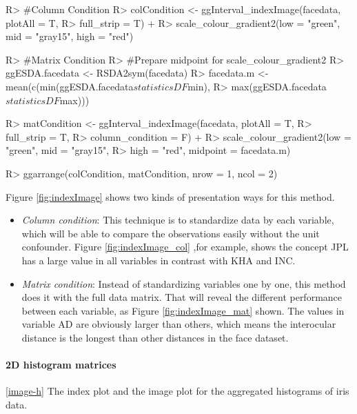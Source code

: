 \documentclass[article]{jss}
\begin{document}
\begin{CodeChunk}
\begin{CodeInput}
R> #Column Condition
R> colCondition <- ggInterval_indexImage(facedata, plotAll = T,
                                      R> full_strip = T) +
R>   scale_colour_gradient2(low = "green", mid = "gray15", high = "red")

R> #Matrix Condition
R> #Prepare midpoint for scale_colour_gradient2
R> ggESDA.facedata <- RSDA2sym(facedata)
R> facedata.m <- mean(c(min(ggESDA.facedata$statisticsDF$min),
R>                      max(ggESDA.facedata$statisticsDF$max)))
                                      
R> matCondition <- ggInterval_indexImage(facedata, plotAll = T,
R>                                       full_strip = T,
R>                                       column_condition = F) + 
R>   scale_colour_gradient2(low = "green", mid = "gray15", 
R>                          high = "red", midpoint = facedata.m)

R> ggarrange(colCondition, matCondition, nrow = 1, ncol = 2)
\end{CodeInput}
\end{CodeChunk}



Figure \ref{fig:indexImage} shows two kinds of presentation ways for this method.

\begin{itemize}
  \item \emph{Column condition}: This technique is to standardize data by each variable, which will be able to compare the observations easily without the unit confounder. Figure \ref{fig:indexImage_col} ,for example, shows the concept JPL has a large value in all variables in contrast with KHA and INC.
  \item \emph{Matrix condition}: Instead of standardizing variables one by one, this method does it with the full data matrix. That will reveal the different performance between each variable, as Figure \ref{fig:indexImage_mat} shown. The values in variable AD are obviously larger than others, which means the interocular distance is the longest than other distances in the face dataset.
\end{itemize}



\paragraph{2D histogram matrices}
\ref{image-h} The index plot and the image plot for the aggregated histograms 
of 
iris data.
\end{document}
